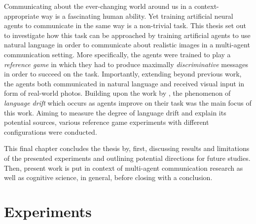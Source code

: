 Communicating about the ever-changing world around us in a context-appropriate way is a fascinating human ability. Yet training artificial neural agents to communicate in the same way is a non-trivial task. This thesis set out to investigate how this task can be approached by training artificial agents to use natural language in order to communicate about realistic images in a multi-agent communication setting. More specifically, the agents were trained to play a \emph{reference game} in which they had to produce maximally \emph{discriminative} messages in order to succeed on the task. Importantly, extending beyond previous work, the agents both communicated in natural language and received visual input in form of real-world photos. Building upon the work by \cite{lazaridou2020multi}, the phenomenon of \emph{language drift} which occurs as agents improve on their task was the main focus of this work. Aiming to measure the degree of language drift and explain its potential sources, various reference game experiments with different configurations were conducted. 

This final chapter concludes the thesis by, first, discussing results and limitations of the presented experiments and outlining potential directions for future studies. Then, present work is put in context of multi-agent communication research as well as cognitive science, in general, before closing with a conclusion. 

\section{Experiments}

